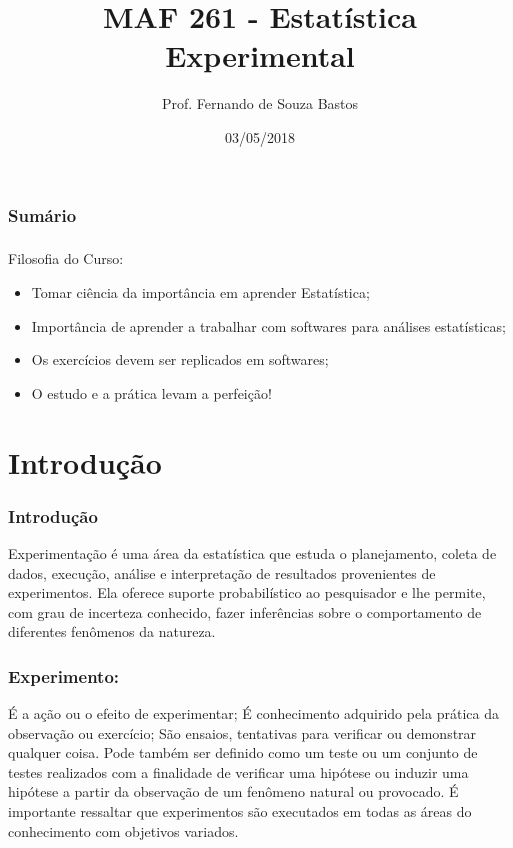 \documentclass[14pt,aspectratio=1610]{beamer}
\title{MAF 261 - Estatística Experimental}
\author{Prof. Fernando de Souza Bastos}
\institute{Instituto de Ciências Exatas e Tecnológicas\texorpdfstring{\\ Universidade Federal de Viçosa}{}\texorpdfstring{\\ Campus UFV - Florestal}{}}
\date{03/05/2018}
\begin{document}
\frame{\titlepage}

\begin{frame}{}
\frametitle{\bf Sumário}
\tableofcontents
\end{frame}


\begin{frame}{}
\frametitle{}

\begin{block}{Filosofia do Curso:}
\begin{itemize}
    \item Tomar ciência da importância em aprender Estatística;\pause
    \item Importância de aprender a trabalhar com softwares para análises estatísticas;\pause
    \item Os exercícios devem ser replicados em softwares;\pause
    \item O estudo e a prática levam a perfeição!
\end{itemize}
\end{block}
\end{frame}
\section{Introdução}
\begin{frame}{}
\frametitle{Introdução}
\begin{block}{}
\justifying
Experimentação é uma área da estatística que estuda o planejamento, coleta de dados, execução, análise e interpretação de resultados provenientes de experimentos. 
Ela oferece suporte probabilístico ao pesquisador e lhe permite, com grau de incerteza conhecido, fazer inferências sobre o comportamento de diferentes fenômenos 
da natureza.
\end{block}
\end{frame}

\begin{frame}{}
\frametitle{Experimento:}
\begin{block}{}
\justifying
É a ação ou o efeito de experimentar; É conhecimento adquirido pela prática da observação ou exercício; São ensaios, tentativas para verificar ou demonstrar qualquer 
coisa. Pode também ser definido como um teste ou um conjunto de testes realizados com a finalidade de verificar uma hipótese ou induzir uma hipótese a partir da 
observação de um fenômeno natural ou provocado. É importante ressaltar que experimentos são executados em todas as áreas do conhecimento com objetivos variados.
\end{block}
\end{frame}
\end{document}

